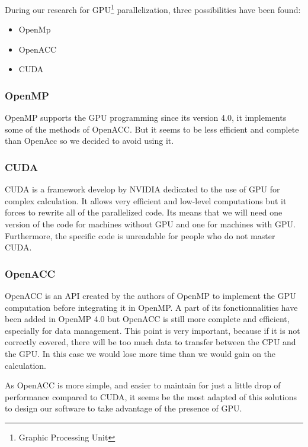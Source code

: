 During our research for GPU\footnote{Graphic Processing Unit} parallelization, three possibilities have been found:
\begin{itemize}
\item OpenMp
\item OpenACC
\item CUDA
\end{itemize}


\subsubsection{OpenMP}
OpenMP supports the GPU programming since its version 4.0, it implements some of the methods of OpenACC. But it seems to be less efficient and complete than OpenAcc so we decided to avoid using it.

\subsubsection{CUDA}
CUDA is a framework develop by NVIDIA dedicated to the use of GPU for complex calculation. It allows very efficient and low-level computations but it forces to rewrite all of the parallelized code. Its means that we will need one version of the code for machines without GPU and one for machines with GPU. Furthermore, the specific code is unreadable for people who do not master CUDA.

\subsubsection{OpenACC}
OpenACC is an API created by the authors of OpenMP to implement the GPU computation before integrating it in OpenMP. A part of its fonctionnalities have been added in OpenMP 4.0 but OpenACC is still more complete and efficient, especially for data management. This point is very important, because if it is not correctly covered, there will be too much data to transfer between the CPU and the GPU. In this case we would lose more time than we would gain on the calculation. 

As OpenACC is more simple, and easier to maintain for just a little drop of performance compared to CUDA, it seems be the most adapted of this solutions to design our software to take advantage of the presence of GPU.